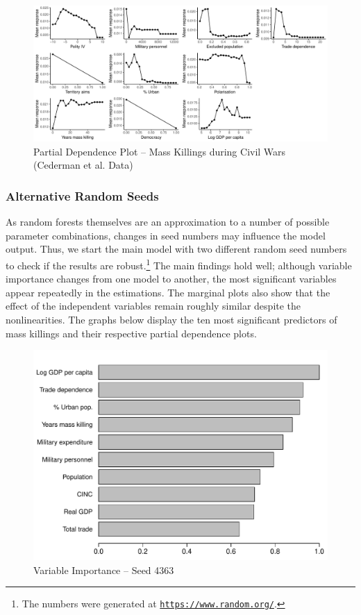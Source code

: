 \newpage 

\clearpage
\begin{figure}
    \centering
    \includegraphics[width=.85\textwidth]{images/rf-eth-pd.pdf}
    \caption{Partial Dependence Plot -- Mass Killings during Civil Wars (Cederman et al. Data)}
    \label{fig:rf-mk-ucdp-pd}
\end{figure}
\clearpage

\newpage

\subsubsection{Alternative Random Seeds}

As random forests themselves are an approximation to a number of possible parameter combinations, changes in seed numbers may influence the model output. Thus, we start the main model with two different random seed numbers to check if the results are robust.\footnote{The numbers were generated at \href{https://www.random.org/}{\texttt{https://www.random.org/}}.} The main findings hold well; although variable importance changes from one model to another, the most significant variables appear repeatedly in the estimations. The marginal plots also show that the effect of the independent variables remain roughly similar despite the nonlinearities. The graphs below display the ten most significant predictors of mass killings and their respective partial dependence plots.

\begin{figure}[H]
    \centering
    \includegraphics[width=.85\textwidth]{images/rf-mk-4363.pdf}
    \caption{Variable Importance -- Seed 4363}
    \label{fig:rf-mk-4363}
\end{figure}

